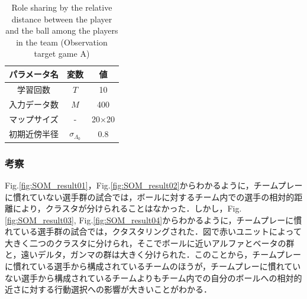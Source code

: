 \begin{table}[t]
	\begin{center}
	\caption{Role sharing by the relative distance between the player and the ball among the players in the team (Observation target game A)}
	\begin{tabular}{|c|c|c|}\hline
		\label{table:3}
	 	パラメータ名 & 変数 & 値  \\ \hline \hline
	 	学習回数 & $T$ & 10  \\
   	 	入力データ数 & $M$ & 400 \\
		マップサイズ & - &20×20\\
   		初期近傍半径 & $\sigma_{\Lambda_0}$ & 0.8 \\ \hline
	\end{tabular}
	\end{center}
\end{table}

\subsubsection{考察}
Fig.\ref{fig:SOM_result01}，Fig.\ref{fig:SOM_result02}からわかるように，チームプレーに慣れていない選手群の試合では，ボールに対するチーム内での選手の相対的距離により，クラスタが分けられることはなかった．しかし，Fig.\ref{fig:SOM_result03}, Fig.\ref{fig:SOM_result04}からわかるように，チームプレーに慣れている選手群の試合では，クタスタリングされた．図で赤いユニットによって大きく二つのクラスタに分けられ，そこでボールに近いアルファとベータの群と，遠いデルタ，ガンマの群は大きく分けられた．このことから，チームプレーに慣れている選手から構成されているチームのほうが，チームプレーに慣れていない選手から構成されているチームよりもチーム内での自分のボールへの相対的近さに対する行動選択への影響が大きいことがわかる．

\clearpage %

